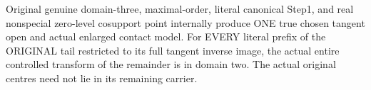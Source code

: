 \begin{theorem}
\label{hir:zero-contact-remainder-all-prefix-domain}
\leanok
{}
Original genuine domain-three, maximal-order, literal canonical Step1,
and real nonspecial zero-level cosupport point internally produce ONE true
chosen tangent open and actual enlarged contact model. For EVERY literal
prefix of the ORIGINAL tail restricted to its full tangent inverse image,
the actual entire controlled transform of the remainder is in domain two.
The actual original centres need not lie in its remaining carrier.
\end{theorem}
